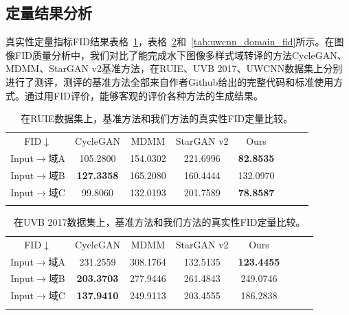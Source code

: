 \subsection{定量结果分析}
真实性定量指标FID结果表格~\ref{tab:ruie_domain_fid}，表格~\ref{tab:uvb_domain_fid}和~\ref{tab:uwcnn_domain_fid}所示。在图像FID质量分析中，我们对比了能完成水下图像多样式域转译的方法CycleGAN、MDMM、StarGAN v2基准方法，在RUIE、UVB 2017、UWCNN数据集上分别进行了测评，测评的基准方法全部来自作者Github给出的完整代码和标准使用方式。通过用FID评价，能够客观的评价各种方法的生成结果。

\begin{table}[ht]
\centering
\caption{在RUIE数据集上，基准方法和我们方法的真实性FID定量比较。}
  \begin{tabular}{c|ccccccc}
    \hline\noalign{\smallskip}
    FID$\downarrow$ & CycleGAN & MDMM & StarGAN v2 & Ours \\
    \noalign{\smallskip}\hline\noalign{\smallskip}
    Input$\rightarrow$域A & 105.2800 & 154.0302 & 221.6996 & \textbf{82.8535}  \\
    Input$\rightarrow$域B & \textbf{127.3358} & 165.2080 & 160.4444 & 132.0970  \\
    Input$\rightarrow$域C & 99.8060 & 132.0193 & 201.7589 & \textbf{78.8587}  \\
    \noalign{\smallskip}\hline
  \end{tabular}
  \label{tab:ruie_domain_fid}
\end{table}

\begin{table}[ht]
\centering
\caption{在UVB 2017数据集上，基准方法和我们方法的真实性FID定量比较。}
  \begin{tabular}{c|ccccccc}
    \hline\noalign{\smallskip}
    FID$\downarrow$ & CycleGAN & MDMM & StarGAN v2 & Ours \\
    \noalign{\smallskip}\hline\noalign{\smallskip}
    Input$\rightarrow$域A & 231.2559 & 308.1764 & 132.5135 & \textbf{123.4455}  \\
    Input$\rightarrow$域B & \textbf{203.3703} & 277.9446 & 261.4843 & 249.0746  \\
    Input$\rightarrow$域C & \textbf{137.9410} & 249.9113 & 203.4555 & 186.2838  \\
    \noalign{\smallskip}\hline
  \end{tabular}
  \label{tab:uvb_domain_fid}
\end{table}

